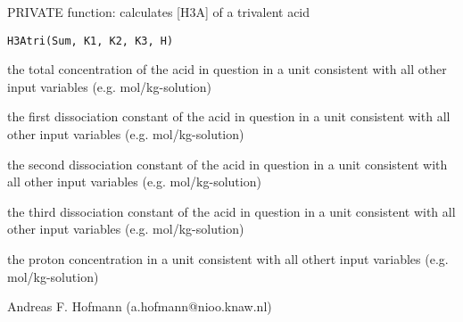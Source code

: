 \documentclass{article}
\begin{document}
\begin{Description}\relax
PRIVATE function: calculates [H3A] of a trivalent acid
\end{Description}
\begin{Usage}
\begin{verbatim}H3Atri(Sum, K1, K2, K3, H)\end{verbatim}
\end{Usage}
\begin{Arguments}
\begin{ldescription}
\item[\code{Sum }] the total concentration of the acid in question in a unit consistent with all other input variables (e.g. mol/kg-solution)
\item[\code{K1 }] the first dissociation constant of the acid in question in a unit consistent with all other input variables (e.g. mol/kg-solution)
\item[\code{K2 }] the second dissociation constant of the acid in question in a unit consistent with all other input variables (e.g. mol/kg-solution)
\item[\code{K3 }] the third dissociation constant of the acid in question in a unit consistent with all other input variables (e.g. mol/kg-solution)
\item[\code{H }] the proton concentration in a unit consistent with all othert input variables (e.g. mol/kg-solution)
\end{ldescription}
\end{Arguments}
\begin{Author}\relax
Andreas F. Hofmann (a.hofmann@nioo.knaw.nl)
\end{Author}
\end{document}

